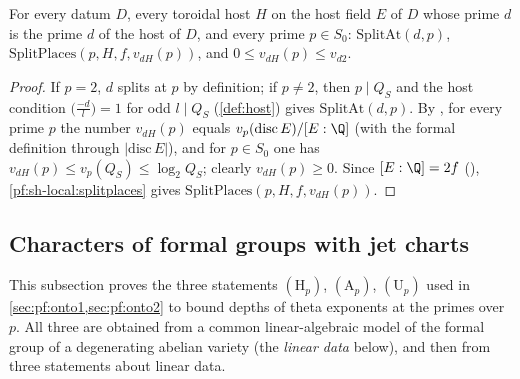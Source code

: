 \begin{theorem}\label{pf:sh-local:twoplaces}
For every datum $D$, every toroidal host $H$ on the host field $E$ of $D$ whose prime $d$ is the prime $d$ of the
host of $D$, and every prime $p\in S_0$: $\mathrm{SplitAt}(d,p)$, $\mathrm{SplitPlaces}(p,H,f,v_{dH}(p))$, and
$0\le v_{dH}(p)\le v_{d2}$.
\end{theorem}

\begin{proof}
If $p=2$, $d$ splits at $p$ by definition; if $p\ne2$, then $p\mid Q_S$ and the host condition
$\bigl(\frac{-d}l\bigr)=1$ for odd $l\mid Q_S$ (\cref{def:host}) gives $\mathrm{SplitAt}(d,p)$. By
, for every prime $p$ the number $v_{dH}(p)$ equals
$v_p(\mathrm{disc}\,E)/[E:\Q]$ (with the formal definition through $|\mathrm{disc}\,E|$), and for $p\in S_0$ one has
$v_{dH}(p)\le v_p(Q_S)\le\log_2Q_S$; clearly $v_{dH}(p)\ge0$. Since $[E:\Q]=2f$
(), \cref{pf:sh-local:splitplaces} gives
$\mathrm{SplitPlaces}(p,H,f,v_{dH}(p))$.
\end{proof}

\subsection{Characters of formal groups with jet charts}\label{sec:pf:sh-local:chart}

This subsection proves the three statements $(\mathrm H_p)$, $(\mathrm A_p)$, $(\mathrm U_p)$ used in
\cref{sec:pf:onto1,sec:pf:onto2} to bound depths of theta exponents at the primes over $p$. All three are
obtained from a common linear-algebraic model of the formal group of a degenerating abelian variety (the
\emph{linear data} below), and then from three statements about linear data.

